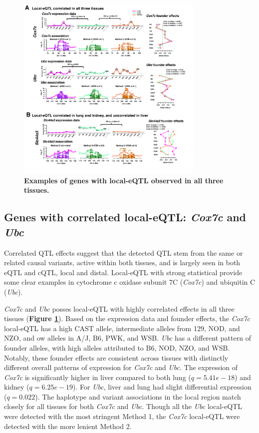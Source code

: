 \begin{figure}[h]
\renewcommand{\familydefault}{\sfdefault}\normalfont
\centering
\includegraphics[width=0.8\textwidth, trim={0in 0.5in 0in 0in}, clip]{figs/correlated_local_eqtl.pdf}
\caption{\textbf{Examples of genes with local-eQTL observed in all three tissues.}\label{fig:correlated_local_eqtl}}
\end{figure}

\subsection{Genes with correlated local-eQTL: \textit{Cox7c} and \textit{Ubc}}

Correlated QTL effects suggest that the detected QTL stem from the same or related causal variants, active within both tissues, and is largely seen in both eQTL and cQTL, local and distal. Local-eQTL with strong statistical provide some clear examples in cytochrome c oxidase subunit 7C (\textit{Cox7c}) and ubiquitin C (\textit{Ubc}).

\textit{Cox7c} and \textit{Ubc} posses local-eQTL with highly correlated effects in all three tissues (\textbf{Figure \ref{fig:correlated_local_eqtl}}). Based on the expression data and founder effects, the \textit{Cox7c} local-eQTL has a high CAST allele, intermediate alleles from 129, NOD, and NZO, and ow alleles in A/J, B6, PWK, and WSB. \textit{Ubc} has a different pattern of founder alleles, with high alleles attributed to B6, NOD, NZO, and WSB. Notably, these founder effects are consistent across tissues with distinctly different overall patterns of expression for \textit{Cox7c} and \textit{Ubc}. The expression of \textit{Cox7c} is significantly higher in liver compared to both lung ($q = 5.41e-18$) and kidney ($q = 6.25e-19$). For \textit{Ubc}, liver and lung had slight differential expression ($q = 0.022$). The haplotype and variant associations in the local region match closely for all tissues for both \textit{Cox7c} and \textit{Ubc}. Though all the \textit{Ubc} local-eQTL were detected with the most stringent Method 1, the \textit{Cox7c} local-eQTL were detected with the more lenient Method 2.

